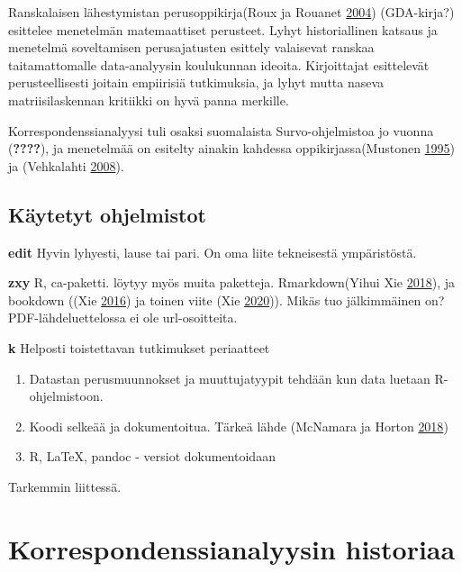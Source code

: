 \documentclass[
  finnish,
]{book}
\providecommand{\tightlist}{%
  \setlength{\itemsep}{0pt}\setlength{\parskip}{0pt}}
\begin{document}
Ranskalaisen lähestymistan perusoppikirja(Roux ja Rouanet
\protect\hyperlink{ref-RefWorks:doc:5a857a43e4b0ed2d44664d75}{2004})
(GDA-kirja?) esittelee menetelmän matemaattiset perusteet. Lyhyt
historiallinen katsaus ja menetelmä soveltamisen perusajatusten esittely
valaisevat ranskaa taitamattomalle data-analyysin koulukunnan ideoita.
Kirjoittajat esittelevät perusteellisesti joitain empiirisiä
tutkimuksia, ja lyhyt mutta naseva matriisilaskennan kritiikki on hyvä
panna merkille.

Korrespondenssianalyysi tuli osaksi suomalaista Survo-ohjelmistoa jo
vuonna (\textbf{????}), ja menetelmää on esitelty ainakin kahdessa
oppikirjassa(Mustonen
\protect\hyperlink{ref-RefWorks:doc:5a857a44e4b0ed2d44664d95}{1995}) ja
(Vehkalahti
\protect\hyperlink{ref-RefWorks:doc:5a857a44e4b0ed2d44664da4}{2008}).

\hypertarget{kuxe4ytetyt-ohjelmistot}{%
\subsection{Käytetyt ohjelmistot}\label{kuxe4ytetyt-ohjelmistot}}

\textbf{edit} Hyvin lyhyesti, lause tai pari. On oma liite tekneisestä
ympäristöstä.

\textbf{zxy} R, ca-paketti. löytyy myös muita paketteja. Rmarkdown(Yihui
Xie
\protect\hyperlink{ref-RefWorks:doc:5b6b346fe4b0c619b11b8a3e}{2018}), ja
bookdown ((Xie
\protect\hyperlink{ref-RefWorks:doc:5b6b36dde4b09b7ec442bf8b}{2016}) ja
toinen viite (Xie \protect\hyperlink{ref-R-bookdown}{2020})). Mikäs tuo
jälkimmäinen on? PDF-lähdeluettelossa ei ole url-osoitteita.

\textbf{k} Helposti toistettavan tutkimukset periaatteet

\begin{enumerate}
\def\labelenumi{\arabic{enumi}.}
\tightlist
\item
  Datastan perusmuunnokset ja muuttujatyypit tehdään kun data luetaan
  R-ohjelmistoon.
\item
  Koodi selkeää ja dokumentoitua. Tärkeä lähde (McNamara ja Horton
  \protect\hyperlink{ref-RefWorks:doc:5c3759c2e4b0085b307c82b5}{2018})
\item
  R, LaTeX, pandoc - versiot dokumentoidaan
\end{enumerate}

Tarkemmin liittessä.

\hypertarget{korrespondenssianalyysin-historiaa}{%
\section{Korrespondenssianalyysin
historiaa}\label{korrespondenssianalyysin-historiaa}}
\end{document}
